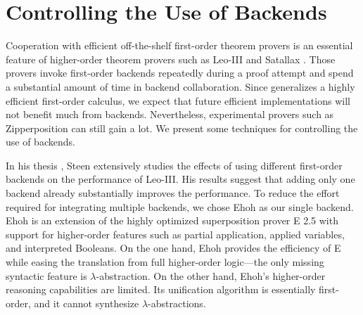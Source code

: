 \documentclass[smallcondensed,draft]{svjour3}     %
\begin{document}


\section{Controlling the Use of Backends}
\label{sec:satfol:ho-tech:backends}

\newcommand{\ParamNumClauses}{\ensuremath{K_\mathrm{size}}}
\newcommand{\ParamTime}{\ensuremath{K_\mathrm{time}}}

Cooperation with efficient off-the-shelf first-order theorem provers is an
essential feature of higher-order theorem provers such as Leo-III
\cite[Sect.~4.4]{as-18-phd} and Satallax \cite{cb-2013-satallax}.
Those provers invoke first-order backends repeatedly
during a proof attempt and spend a substantial amount of time in backend
collaboration. Since \lsup{} generalizes a highly efficient
first-order calculus, we expect that future efficient \lsup{}
implementations will not benefit much from backends.
Nevertheless, experimental provers such
as Zipperposition can still gain a lot. We present some
techniques for controlling the use of backends.

In his thesis \cite[Sect.~6.1]{as-18-phd}, Steen extensively studies
the effects of using different first-order backends on the performance of
Leo-III. His results suggest that adding only one backend already substantially
improves the performance. To reduce the effort required for integrating multiple backends, we chose Ehoh \cite{ehoh-section} as our single
backend. Ehoh is an extension of the highly optimized superposition prover E 2.5
with support for higher-order features such as partial
application, applied variables, and interpreted Booleans.
On the one hand, Ehoh provides the efficiency of E while easing the translation from full
higher-order logic---the only missing syntactic feature is
$\lambda$-abstraction. On the other hand, Ehoh's higher-order reasoning
capabilities are limited. Its unification algorithm is essentially first-order,
and it cannot synthesize $\lambda$-abstractions.
\end{document}

